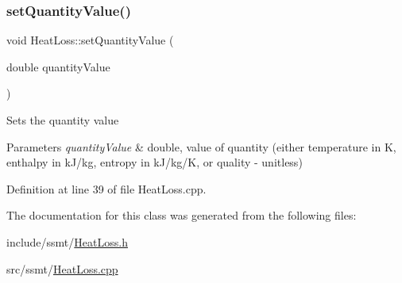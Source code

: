 \subsubsection{\texorpdfstring{set\+Quantity\+Value()}{setQuantityValue()}}
{\footnotesize\ttfamily void Heat\+Loss\+::set\+Quantity\+Value (\begin{DoxyParamCaption}\item[{double}]{quantity\+Value }\end{DoxyParamCaption})}

Sets the quantity value 
\begin{DoxyParams}{Parameters}
{\em quantity\+Value} & double, value of quantity (either temperature in K, enthalpy in k\+J/kg, entropy in k\+J/kg/K, or quality -\/ unitless) \\
\hline
\end{DoxyParams}


Definition at line 39 of file Heat\+Loss.\+cpp.



The documentation for this class was generated from the following files\+:\begin{DoxyCompactItemize}
\item 
include/ssmt/\hyperlink{_heat_loss_8h}{Heat\+Loss.\+h}\item 
src/ssmt/\hyperlink{_heat_loss_8cpp}{Heat\+Loss.\+cpp}\end{DoxyCompactItemize}
